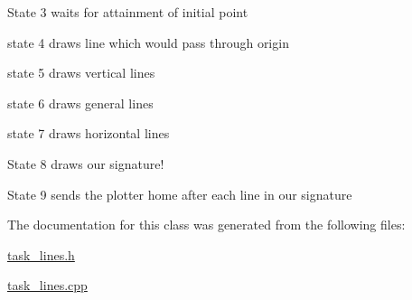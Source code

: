 State 3 waits for attainment of initial point

state 4 draws line which would pass through origin

state 5 draws vertical lines

state 6 draws general lines

state 7 draws horizontal lines

State 8 draws our signature!

State 9 sends the plotter home after each line in our signature 

The documentation for this class was generated from the following files\-:\begin{DoxyCompactItemize}
\item 
\hyperlink{task__lines_8h}{task\-\_\-lines.\-h}\item 
\hyperlink{task__lines_8cpp}{task\-\_\-lines.\-cpp}\end{DoxyCompactItemize}
